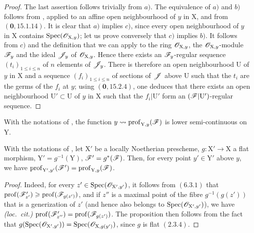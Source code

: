 \begin{proof}
The last assertion follows trivially from $a)$. The equivalence of $a)$ and $b)$ follows from , applied to an affine open neighbourhood of $y$ in $\mathrm{X}$, and from $(\mathbf{0},15.1.14)$. It is clear that $a)$ implies $c)$, since every open neighbourhood of $y$ in $\mathrm{X}$ contains $\operatorname{Spec}(\mathscr{O}_{\mathrm{X},y})$; let us prove conversely that $c)$ implies $b)$. It follows from $c)$ and the definition  that
we can apply  to the ring $\mathscr{O}_{\mathrm{X},y}$, the $\mathscr{O}_{\mathrm{X},y}$-module $\mathscr{F}_y$ and the ideal $\mathscr{J}_y$ of $\mathscr{O}_{\mathrm{X},y}$. Hence there exists an $\mathscr{F}_y$-regular sequence $(t_i)_{1\leqslant i\leqslant n}$ of $n$ elements of $\mathscr{J}_y$. There is therefore an open neighbourhood $\mathrm{U}$ of $y$ in $\mathrm{X}$ and a sequence $(f_i)_{1\leqslant i\leqslant n}$ of sections of $\mathscr{J}$ above $\mathrm{U}$ such that the $t_i$ are the germs of the $f_i$ at $y$; using $(\mathbf{0},15.2.4)$, one deduces that there exists an open neighbourhood $\mathrm{U}'\subset\mathrm{U}$ of $y$ in $\mathrm{X}$ such that the $f_i|\mathrm{U}'$ form an $(\mathscr{F}|\mathrm{U}')$-regular sequence.
\end{proof}

\begin{corollary}[19.9.4]
\label{IV.19.9.4}
With the notations of \emph{}, the function $y\leadsto\operatorname{prof}_{\mathrm{Y},y}(\mathscr{F})$ is lower semi-continuous on $\mathrm{Y}$.
\end{corollary}

\begin{proposition}[19.9.5]
\label{IV.19.9.5}
With the notations of \emph{}, let $\mathrm{X}'$ be a locally Noetherian prescheme, $g:\mathrm{X}'\to\mathrm{X}$ a flat morphism, $\mathrm{Y}'=g^{-1}(\mathrm{Y})$, $\mathscr{F}'=g^*(\mathscr{F})$. Then, for every point $y'\in\mathrm{Y}'$ above $y$, we have $\operatorname{prof}_{\mathrm{Y}',y'}(\mathscr{F}')=\operatorname{prof}_{\mathrm{Y},y}(\mathscr{F})$.
\end{proposition}

\begin{proof}
Indeed, for every $z'\in\operatorname{Spec}(\mathscr{O}_{\mathrm{X}',y'})$, it follows from $(6.3.1)$ that $\operatorname{prof}(\mathscr{F}'_{z'})\geqslant\operatorname{prof}(\mathscr{F}_{g(z')})$, and if $z''$ is a maximal point of the fibre $g^{-1}(g(z'))$ that is a generization of $z'$ (and hence also belongs to $\operatorname{Spec}(\mathscr{O}_{\mathrm{X}',y'})$), we have \emph{(loc.~cit.)} $\operatorname{prof}(\mathscr{F}'_{z''})=\operatorname{prof}(\mathscr{F}_{g(z')})$. The proposition then follows from the fact that $g(\operatorname{Spec}(\mathscr{O}_{\mathrm{X}',y'}))=\operatorname{Spec}(\mathscr{O}_{\mathrm{X},g(y')})$, since $g$ is flat $(2.3.4)$.
\end{proof}

